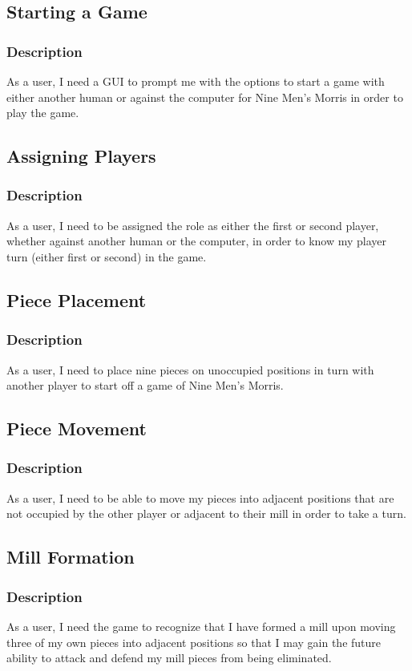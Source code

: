 \documentclass[11pt]{article}
\begin{document}
\subsection{Starting a Game}
\label{sec:org36cf713}
\subsubsection*{Description}
\label{sec:org97aa098}
As a user, I need a GUI to prompt me with the options to start a game with either another human
or against the computer for Nine Men's Morris in order to play the game.
\subsection{Assigning Players}
\label{sec:org5de048f}
\subsubsection*{Description}
\label{sec:org145f6ad}
As a user, I need to be assigned the role as either the first or second player, whether against
another human or the computer, in order to know my player turn (either first or second) in the
game.
\subsection{Piece Placement}
\label{sec:org224bd66}
\subsubsection*{Description}
\label{sec:org52a7d38}
As a user, I need to place nine pieces on unoccupied positions in turn with another player to
start off a game of Nine Men's Morris.
\subsection{Piece Movement}
\label{sec:org896f644}
\subsubsection*{Description}
\label{sec:org3280cae}
As a user, I need to be able to move my pieces into adjacent positions that are not occupied by
the other player or adjacent to their mill in order to take a turn.
\subsection{Mill Formation}
\label{sec:orgdd62d75}
\subsubsection*{Description}
\label{sec:org868e03e}
As a user, I need the game to recognize that I have formed a mill upon moving three of my own
pieces into adjacent positions so that I may gain the future ability to attack and defend my
mill pieces from being eliminated.
\end{document}
